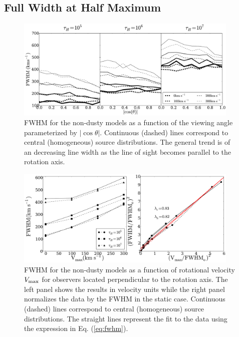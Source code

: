\documentclass{emulateapj}
\begin{document}
	

\subsection{Full Width at Half Maximum}
\label{sec:widthpeak}

\begin{figure}
\begin{center}
  \includegraphics[width=0.95\textwidth]{f6.pdf}
\end{center}
  \caption{FWHM for the non-dusty models as a function of the viewing
  angle parameterized by $|\cos\theta|$. Continuous (dashed) lines  correspond
  to central (homogeneous) source distributions. The general trend is
  of an decreasing line width as the line of sight becomes parallel to the
  rotation axis.
  \label{fig:widthvsmu}} 
\end{figure}

\begin{figure}
\begin{center}
  \includegraphics[width=0.95\textwidth]{f7.pdf}
\end{center}
\caption{FWHM for the non-dusty models as a function of
  rotational velocity $V_{\rm max}$ for observers located
  perpendicular to the rotation axis. 
  The left panel shows the results in velocity units while the right
  panel normalizes the data by the FWHM in the static case. 
  Continuous (dashed) lines  correspond to central (homogeneous)
  source distributions. 
  The straight lines represent the fit to the data using the
  expression in Eq. (\ref{eq:fwhm}). 
  \label{fig:widthsvsvelocity}}
\end{figure}
\end{document}
